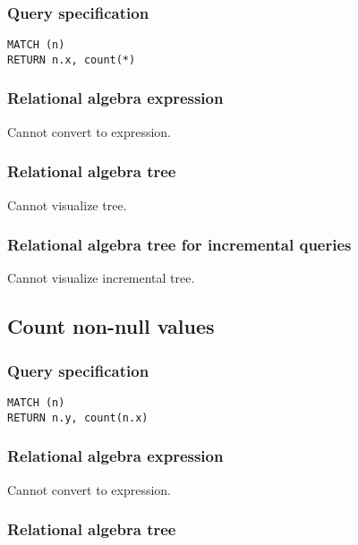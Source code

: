 \subsubsection*{Query specification}

\begin{lstlisting}
MATCH (n)
RETURN n.x, count(*)
\end{lstlisting}

\subsubsection*{Relational algebra expression}

Cannot convert to expression.

\subsubsection*{Relational algebra tree}

Cannot visualize tree.

\subsubsection*{Relational algebra tree for incremental queries}

Cannot visualize incremental tree.

\subsection{Count non-null values}

\subsubsection*{Query specification}

\begin{lstlisting}
MATCH (n)
RETURN n.y, count(n.x)
\end{lstlisting}

\subsubsection*{Relational algebra expression}

Cannot convert to expression.

\subsubsection*{Relational algebra tree}

